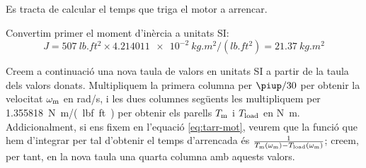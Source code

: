 \begin{exemple}
 Es tracta de calcular el temps que triga el motor a arrencar.

Convertim primer el moment d'inèrcia a unitats SI:
\[
    J =  \qty{507}{lb.ft^2} \times \qty{4,214011e-2}{kg.m^2/(lb.ft^2)}
    = \qty{21,37}{kg.m^2}
\]

Creem a continuació una nova taula de valors en unitats SI a partir de la taula dels valors donats. Multipliquem la primera columna per $\piup/30$ per obtenir la velocitat $\omega_\mathrm{m}$ en \unit{rad/s}, i les dues columnes següents les multipliquem per \qty{1,355818}{N.m/(lbf.ft)} per obtenir els parells $T_\mathrm{m}$ i $T_\mathrm{load}$ en \unit{N.m}. Addicionalment, si ens fixem en l'equació \eqref{eq:tarr-mot}, veurem que la funció que hem d'integrar per tal d'obtenir el temps d'arrencada és $\frac{1}{T_\mathrm{m}(\omega_\mathrm{m})-T_\mathrm{load}(\omega_\mathrm{m})}$; creem, per tant, en la nova taula una quarta columna amb aquests valors.


\end{exemple}
